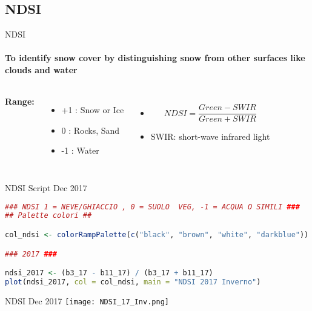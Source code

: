 \documentclass[10pt]{beamer}
\begin{document}
\subsection{NDSI}
\begin{frame}{NDSI}
    \framesubtitle{To identify snow cover by distinguishing snow from other surfaces like clouds and water}
    \begin{columns}
            \textbf{Range:}
            \begin{itemize}
                \item +1 : Snow or Ice
                \item \hspace{0.8em}0 : Rocks, Sand
                \item \hspace{0.5em}-1 : Water
            \end{itemize}
            \vfill %
            \begin{itemize}
                \item   \[
                        NDSI = \frac{Green - SWIR}{Green + SWIR}
                        \]
                \item \small{SWIR: short-wave infrared light}
            \end{itemize}
            \vfill %
    \end{columns}
\end{frame}

\begin{frame}[fragile]{NDSI Script Dec 2017}
    \begin{lstlisting}[language=R]
### NDSI 1 = NEVE/GHIACCIO , 0 = SUOLO  VEG, -1 = ACQUA O SIMILI ###    
## Palette colori ##

col_ndsi <- colorRampPalette(c("black", "brown", "white", "darkblue")) (100)

### 2017 ###

ndsi_2017 <- (b3_17 - b11_17) / (b3_17 + b11_17)
plot(ndsi_2017, col = col_ndsi, main = "NDSI 2017 Inverno")
    \end{lstlisting}
\end{frame}

\begin{frame}{NDSI Dec 2017}
    \centering
    \texttt{[image: NDSI\_17\_Inv.png]}  
    
\end{frame}
\end{document}
